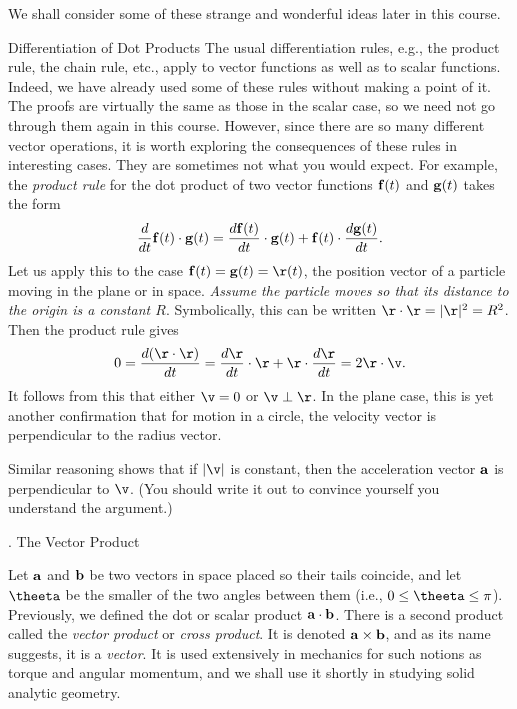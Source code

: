 We shall consider some of these strange and wonderful ideas later in
this course.      

\subhead Differentiation of Dot Products \endsubhead
The usual differentiation rules, e.g., the product rule, the chain
rule, etc., apply to vector functions as well as to scalar functions.
Indeed, we have already used some of these rules without making a
point of it.   The proofs are virtually the same as those in the
scalar case, so we need not go through them again in this course.
However, since there are so many different vector operations, it
is worth exploring the consequences of these rules in interesting
cases.  They are sometimes not what you would expect.
For example, the {\it product rule\/} for the dot product of two
vector functions $\bold f(t)$ and $\bold g(t)$ takes the form
\nexteqn
$$
    \frac d{dt}\bold f(t)\cdot \bold g(t) =
    \frac{d\bold f(t)}{dt} \cdot \bold g(t) +
          \bold f(t)\cdot\frac{d\bold g(t)}{dt}.
$$
%
Let us apply this to the case $\bold f(t) = \bold g(t) = \r(t)$,
the position vector of a particle moving in the plane or in space.  
{\it Assume the particle moves so that its distance to the origin
is a constant  $R$}.    Symbolically, this can be written
$ \r\cdot\r = |\r|^2 = R^2$.   Then the product rule gives
$$
    0 = \frac{d(\r\cdot\r)}{dt} = \frac{d\r}{dt}\cdot\r +
  \r\cdot\frac{d\r}{dt} = 2\r\cdot \v.
$$
It follows from this that either $\v = 0$ or $\v\perp\r$.   In the
plane case, this is yet another confirmation that for motion in
a circle, the velocity vector is perpendicular to the radius vector.

Similar reasoning shows that if $|\v|$ is constant, then the
acceleration vector $\bold a$ is perpendicular to $\v$.  (You should write
it out to convince yourself you understand the argument.)
\bigskip



\head \sn. The Vector Product \endhead

Let $\bold a$ and $\bold b$ be two vectors in space placed so their tails
coincide, and let $\theeta$ be the smaller of the two angles between
them (i.e., $0\le \theeta \le \pi$).  
 Previously, we defined the dot or scalar product $\bold a\cdot\bold b$.
There is a second product  called
 the {\it vector product\/} or {\it cross product\/}. It is denoted
%
%
$\bold a\times\bold b$, and as its name suggests, it is a 
{\it vector}.  It is used extensively in mechanics for such notions
as torque and angular momentum, and we shall use it shortly in
studying solid analytic geometry.

